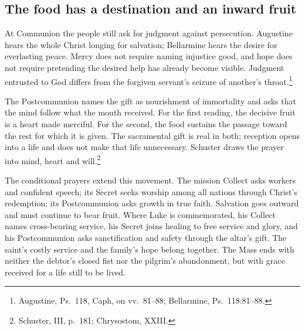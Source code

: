 \subsection{The food has a destination and an inward fruit}
At Communion the people still ask for judgment against persecution. Augustine hears the whole Christ longing for salvation; Bellarmine hears the desire for everlasting peace. Mercy does not require naming injustice good, and hope does not require pretending the desired help has already become visible. Judgment entrusted to God differs from the forgiven servant's seizure of another's throat.\footnote{Augustine, Ps.~118, Caph, on vv.~81--88; Bellarmine, Ps.~118:81--88.}

The Postcommunion names the gift as nourishment of immortality and asks that the mind follow what the mouth received. For the first reading, the decisive fruit is a heart made merciful. For the second, the food sustains the passage toward the rest for which it is given. The sacramental gift is real in both; reception opens into a life and does not make that life unnecessary. Schuster draws the prayer into mind, heart and will.\footnote{Schuster, III, p.~181; Chrysostom,  XXIII.}

The conditional prayers extend this movement. The mission Collect asks workers and confident speech; its Secret seeks worship among all nations through Christ's redemption; its Postcommunion asks growth in true faith. Salvation goes outward and must continue to bear fruit. Where Luke is commemorated, his Collect names cross-bearing service, his Secret joins healing to free service and glory, and his Postcommunion asks sanctification and safety through the altar's gift. The saint's costly service and the family's hope belong together. The Mass ends with neither the debtor's closed fist nor the pilgrim's abandonment, but with grace received for a life still to be lived.
\clearpage
